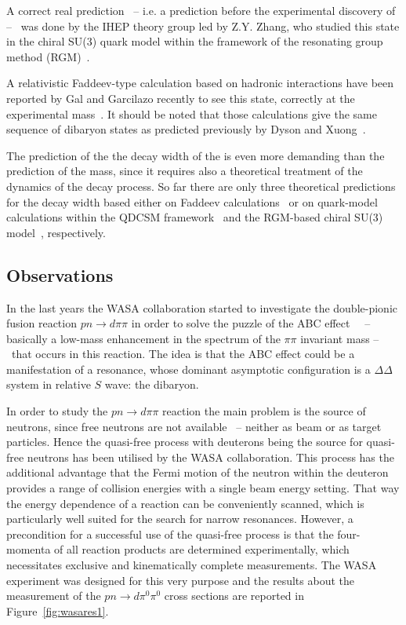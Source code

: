 A correct real prediction \ -- i.e. a prediction before the experimental discovery of \dst -- \ was done 
by the IHEP theory group led by Z.Y. Zhang, who studied this state in the chiral SU(3) quark model within
the framework of the resonating group method (RGM)~\cite{dsqm2}.

A relativistic Faddeev-type calculation based on hadronic interactions have been reported by Gal and Garcilazo
recently to see this state, correctly at the experimental mass~\cite{reanalysis,haddin,haddin1}. 
It should be noted that those calculations give the same sequence of dibaryon states as predicted previously by 
Dyson and Xuong~\cite{dysonxuong}.

The prediction of the the decay width of the \dst is even more demanding than the prediction of the mass, since
it requires also a theoretical treatment of the dynamics of the decay process.
So far there are only three theoretical predictions for the decay width based either on Faddeev
calculations~\cite{reanalysis,haddin,haddin1} or on quark-model calculations within the
QDCSM  framework~\cite{widthpred1,dsqm1} and the RGM-based chiral SU(3) 
model~\cite{widthpred2,widthpred3}, respectively.

%
\subsection{Observations} \label{sec:2.2.2}

In the last years the WASA collaboration started to investigate the double-pionic fusion reaction 
$pn \rightarrow d \pi \pi$ in order to solve the puzzle of the ABC effect~\cite{abc} \ -- basically
a low-mass enhancement in the spectrum of the $\pi \pi$ invariant mass -- \ that occurs in this
reaction.
The idea is that the ABC effect could be a manifestation of a resonance, whose dominant asymptotic
configuration is a $\Delta \Delta$ system in relative $S$ wave: the \ds dibaryon.

In order to study the $pn \rightarrow d \pi \pi$ reaction the main problem is the source of
neutrons, since free neutrons are not available \ -- neither as beam or as target particles. 
Hence the quasi-free process with deuterons being the source for quasi-free neutrons has been utilised
by the WASA collaboration.
This process has the additional advantage that the Fermi motion of the neutron within the deuteron 
provides a range of collision energies with a single beam energy setting.
That way the energy dependence of a reaction can be conveniently scanned, which is particularly well
suited for the search for narrow resonances.
However, a precondition for a successful use of the quasi-free process is that the four-momenta of all
reaction products are determined experimentally, which necessitates exclusive and kinematically complete
measurements.
The WASA experiment was designed for this very purpose and the results about the measurement 
of the $pn \rightarrow d \pi^{0} \pi^{0}$ cross sections are reported in Figure~\ref{fig:wasares1}.

